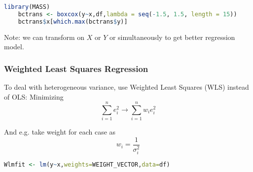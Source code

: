 \begin{itemize}[topsep=2pt,itemsep=2pt]
\begin{itemize}[topsep=2pt,itemsep=2pt]
                
            \end{itemize}
            
                
            
    \begin{rcode}
    \begin{lstlisting}[language=R]
    library(MASS)
    bctrans <- boxcox(y~x,df,lambda = seq(-1.5, 1.5, length = 15))
    bctrans$x[which.max(bctrans$y)]
    \end{lstlisting}
    
    \end{rcode}
            
            
        Note: we can transform on $ X $ or $ Y $ or simultaneously to get better regression model.
        
    \end{itemize}

\subsubsection{Weighted Least Squares Regression}
    To deal with heterogeneous variance, use Weighted Least Squares (WLS) instead of OLS: Minimizing
    \[
        \sum_{i=1}^ne_i^2\longrightarrow \sum_{i=1}^nw_ie^2_i         
    \]
    
    And e.g. take weight for each case as 
    \[
        w_i=\dfrac{1}{\sigma _i^2} 
    \]
\begin{rcode}
\begin{lstlisting}[language=R]
Wlmfit <- lm(y~x,weights=WEIGHT_VECTOR,data=df)
\end{lstlisting}
\end{rcode}
    
    
    







